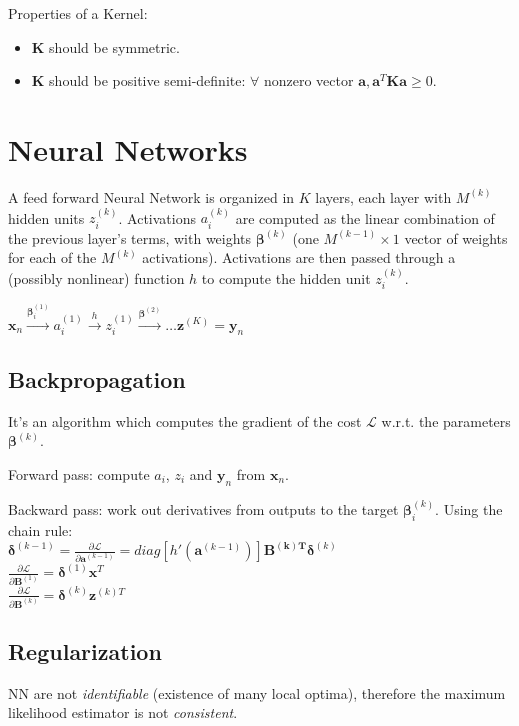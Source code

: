 \documentclass[10pt,a4paper,landscape]{article}
\providecommand{\bf}[1]{\ensuremath{\mathbf{#1}}}
\newcommand{\bbeta}{\boldsymbol\beta}
\newcommand{\bdelta}{\boldsymbol\delta}
\begin{document}
\begin{multicols*}{4}
Properties of a Kernel:
\begin{itemize}
\item $\bf{K}$ should be symmetric.
\item $\bf{K}$ should be positive semi-definite: $\forall$ nonzero vector $\bf{a}, \bf{a}^T \bf{K} \bf{a} \geq 0$.
\end{itemize}

\section{Neural Networks}
A feed forward Neural Network is organized in $K$ layers, each layer with $M^{(k)}$ hidden units $z_i^{(k)}$. Activations $a_i^{(k)}$ are computed as the linear combination of the previous layer's terms, with weights $\bbeta^{(k)}$ (one $M^{(k-1)} \times 1$ vector of weights for each of the $M^{(k)}$ activations). Activations are then passed through a (possibly nonlinear) function $h$ to compute the hidden unit $z_i^{(k)}$.

$\bf{x}_n \xrightarrow{\bbeta_i^{(1)}} a_i^{(1)} \xrightarrow{h} z_i^{(1)} \xrightarrow{\bbeta^{(2)}} \dots \bf{z}^{(K)} = \bf{y}_n$

\subsection{Backpropagation}
It's an algorithm which computes the gradient of the cost $\mathcal{L}$ w.r.t. the parameters $\bbeta^{(k)}$.

Forward pass: compute $a_i$, $z_i$ and $\bf{y}_n$ from $\bf{x}_n$.

Backward pass: work out derivatives from outputs to the target $\bbeta_i^{(k)}$. Using the chain rule:\\
$\bdelta^{(k-1)} = \frac{\partial \mathcal{L}}{\partial \bf{a}^{(k-1)}} = diag[ h'(\bf{a}^{(k-1)}) ] \bf{B^{(k)T}} \bdelta^{(k)}$\\
$\frac{\partial \mathcal{L}}{\partial \bf{B}^{(1)}} = \bdelta^{(1)} \bf{x}^T$\\
$\frac{\partial \mathcal{L}}{\partial \bf{B}^{(k)}} = \bdelta^{(k)} \bf{z}^{(k)T}$

\subsection{Regularization}
NN are not \textit{identifiable} (existence of many local optima), therefore the maximum likelihood estimator is not \textit{consistent}.


\end{multicols*}
\end{document}
